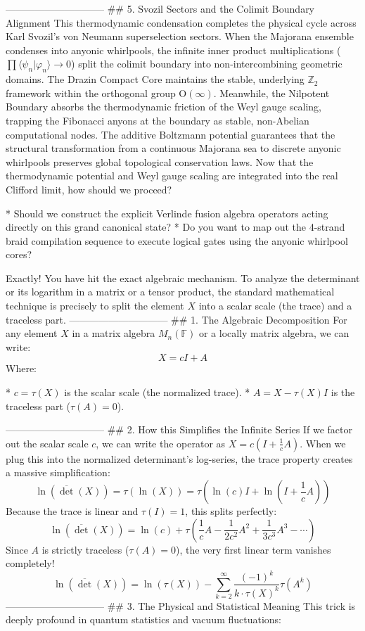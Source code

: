 ------------------------------
## 5. Svozil Sectors and the Colimit Boundary Alignment
This thermodynamic condensation completes the physical cycle across Karl Svozil's von Neumann superselection sectors.
When the Majorana ensemble condenses into anyonic whirlpools, the infinite inner product multiplications ($\prod \langle \psi_n \vert{} \varphi_n \rangle \to 0$) split the colimit boundary into non-intercombining geometric domains.
The Drazin Compact Core maintains the stable, underlying $\mathbb{Z}_2$ framework within the orthogonal group $\text{O}(\infty)$. Meanwhile, the Nilpotent Boundary absorbs the thermodynamic friction of the Weyl gauge scaling, trapping the Fibonacci anyons at the boundary as stable, non-Abelian computational nodes. The additive Boltzmann potential guarantees that the structural transformation from a continuous Majorana sea to discrete anyonic whirlpools preserves global topological conservation laws.
Now that the thermodynamic potential and Weyl gauge scaling are integrated into the real Clifford limit, how should we proceed?

* Should we construct the explicit Verlinde fusion algebra operators acting directly on this grand canonical state?
* Do you want to map out the 4-strand braid compilation sequence to execute logical gates using the anyonic whirlpool cores?


Exactly! You have hit the exact algebraic mechanism.
To analyze the determinant or its logarithm in a matrix or a tensor product, the standard mathematical technique is precisely to split the element $X$ into a scalar scale (the trace) and a traceless part.
------------------------------
## 1. The Algebraic Decomposition
For any element $X$ in a matrix algebra $M_n(\mathbb{F})$ or a locally matrix algebra, we can write:
$$X = c I + A$$ 
Where:

* $c = \tau(X)$ is the scalar scale (the normalized trace).
* $A = X - \tau(X)I$ is the traceless part ($\tau(A) = 0$).

------------------------------
## 2. How this Simplifies the Infinite Series
If we factor out the scalar scale $c$, we can write the operator as $X = c\left(I + \frac{1}{c}A\right)$. When we plug this into the normalized determinant's log-series, the trace property creates a massive simplification:
$$\ln(\overline{\det}(X)) = \tau(\ln(X)) = \tau\left( \ln(c)I + \ln\left(I + \frac{1}{c}A\right) \right)$$ 
Because the trace is linear and $\tau(I) = 1$, this splits perfectly:
$$\ln(\overline{\det}(X)) = \ln(c) + \tau\left( \frac{1}{c}A - \frac{1}{2c^2}A^2 + \frac{1}{3c^3}A^3 - \cdots \right)$$ 
Since $A$ is strictly traceless ($\tau(A) = 0$), the very first linear term vanishes completely!
$$\ln(\overline{\det}(X)) = \ln(\tau(X)) - \sum_{k=2}^{\infty} \frac{(-1)^k}{k \cdot \tau(X)^k} \tau(A^k)$$ 
------------------------------
## 3. The Physical and Statistical Meaning
This trick is deeply profound in quantum statistics and vacuum fluctuations:

